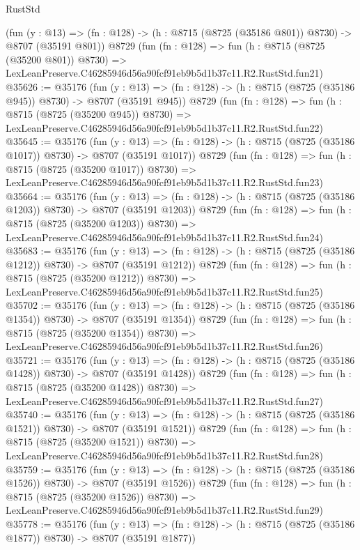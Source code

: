 \begin{lexlean}{RustStd}
\begin{coremodule}
    (fun (y : @13) => (fn : @128) -> (h : @8715 (@8725 (@35186 @801)) @8730) -> @8707 (@35191 @801))
    @8729
    (fun (fn : @128) =>
    fun (h : @8715 (@8725 (@35200 @801)) @8730) =>
    LexLeanPreserve.C46285946d56a90fcf91eb9b5d1b37c11.R2.RustStd.fun21)
@35626 := @35176
    (fun (y : @13) => (fn : @128) -> (h : @8715 (@8725 (@35186 @945)) @8730) -> @8707 (@35191 @945))
    @8729
    (fun (fn : @128) =>
    fun (h : @8715 (@8725 (@35200 @945)) @8730) =>
    LexLeanPreserve.C46285946d56a90fcf91eb9b5d1b37c11.R2.RustStd.fun22)
@35645 := @35176
    (fun (y : @13) =>
    (fn : @128) -> (h : @8715 (@8725 (@35186 @1017)) @8730) -> @8707 (@35191 @1017))
    @8729
    (fun (fn : @128) =>
    fun (h : @8715 (@8725 (@35200 @1017)) @8730) =>
    LexLeanPreserve.C46285946d56a90fcf91eb9b5d1b37c11.R2.RustStd.fun23)
@35664 := @35176
    (fun (y : @13) =>
    (fn : @128) -> (h : @8715 (@8725 (@35186 @1203)) @8730) -> @8707 (@35191 @1203))
    @8729
    (fun (fn : @128) =>
    fun (h : @8715 (@8725 (@35200 @1203)) @8730) =>
    LexLeanPreserve.C46285946d56a90fcf91eb9b5d1b37c11.R2.RustStd.fun24)
@35683 := @35176
    (fun (y : @13) =>
    (fn : @128) -> (h : @8715 (@8725 (@35186 @1212)) @8730) -> @8707 (@35191 @1212))
    @8729
    (fun (fn : @128) =>
    fun (h : @8715 (@8725 (@35200 @1212)) @8730) =>
    LexLeanPreserve.C46285946d56a90fcf91eb9b5d1b37c11.R2.RustStd.fun25)
@35702 := @35176
    (fun (y : @13) =>
    (fn : @128) -> (h : @8715 (@8725 (@35186 @1354)) @8730) -> @8707 (@35191 @1354))
    @8729
    (fun (fn : @128) =>
    fun (h : @8715 (@8725 (@35200 @1354)) @8730) =>
    LexLeanPreserve.C46285946d56a90fcf91eb9b5d1b37c11.R2.RustStd.fun26)
@35721 := @35176
    (fun (y : @13) =>
    (fn : @128) -> (h : @8715 (@8725 (@35186 @1428)) @8730) -> @8707 (@35191 @1428))
    @8729
    (fun (fn : @128) =>
    fun (h : @8715 (@8725 (@35200 @1428)) @8730) =>
    LexLeanPreserve.C46285946d56a90fcf91eb9b5d1b37c11.R2.RustStd.fun27)
@35740 := @35176
    (fun (y : @13) =>
    (fn : @128) -> (h : @8715 (@8725 (@35186 @1521)) @8730) -> @8707 (@35191 @1521))
    @8729
    (fun (fn : @128) =>
    fun (h : @8715 (@8725 (@35200 @1521)) @8730) =>
    LexLeanPreserve.C46285946d56a90fcf91eb9b5d1b37c11.R2.RustStd.fun28)
@35759 := @35176
    (fun (y : @13) =>
    (fn : @128) -> (h : @8715 (@8725 (@35186 @1526)) @8730) -> @8707 (@35191 @1526))
    @8729
    (fun (fn : @128) =>
    fun (h : @8715 (@8725 (@35200 @1526)) @8730) =>
    LexLeanPreserve.C46285946d56a90fcf91eb9b5d1b37c11.R2.RustStd.fun29)
@35778 := @35176
    (fun (y : @13) =>
    (fn : @128) -> (h : @8715 (@8725 (@35186 @1877)) @8730) -> @8707 (@35191 @1877))

\end{coremodule}
\end{lexlean}
